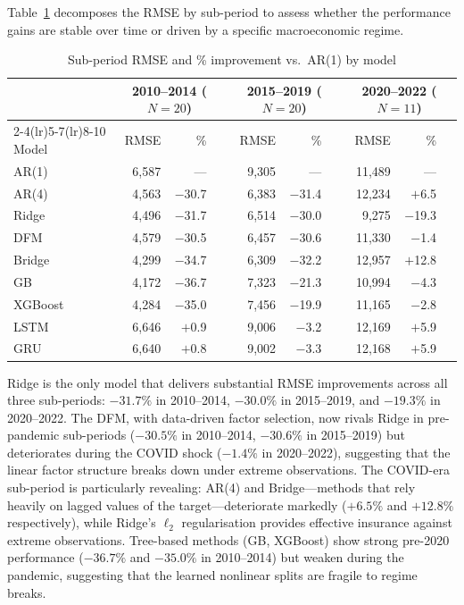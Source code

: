 Table~\ref{tab:ch1_subperiod} decomposes the RMSE by sub-period to assess whether the performance gains are stable over time or driven by a specific macroeconomic regime.

\begin{table}[htbp]
\centering
\caption{Sub-period RMSE and \% improvement vs.\ AR(1) by model}
\label{tab:ch1_subperiod}
\begin{tabular}{@{} l rrr rrr rrr @{}}
\toprule
 & \multicolumn{3}{c}{2010--2014 ($N=20$)} & \multicolumn{3}{c}{2015--2019 ($N=20$)} & \multicolumn{3}{c}{2020--2022 ($N=11$)} \\
\cmidrule(lr){2-4}\cmidrule(lr){5-7}\cmidrule(lr){8-10}
{Model} & {RMSE} & {\%} & & {RMSE} & {\%} & & {RMSE} & {\%} \\
\midrule
AR(1)     & 6{,}587 & ---  && 9{,}305 & ---  && 11{,}489 & --- \\
AR(4)     & 4{,}563 & $-$30.7 && 6{,}383 & $-$31.4 && 12{,}234 & $+$6.5 \\
Ridge     & 4{,}496 & $-$31.7 && 6{,}514 & $-$30.0 && 9{,}275  & $-$19.3 \\
DFM       & 4{,}579 & $-$30.5 && 6{,}457 & $-$30.6  && 11{,}330 & $-$1.4 \\
Bridge    & 4{,}299 & $-$34.7 && 6{,}309 & $-$32.2 && 12{,}957 & $+$12.8 \\
GB        & 4{,}172 & $-$36.7 && 7{,}323 & $-$21.3 && 10{,}994 & $-$4.3 \\
XGBoost   & 4{,}284 & $-$35.0 && 7{,}456 & $-$19.9 && 11{,}165 & $-$2.8 \\
LSTM      & 6{,}646 & $+$0.9  && 9{,}006 & $-$3.2  && 12{,}169 & $+$5.9 \\
GRU       & 6{,}640 & $+$0.8  && 9{,}002 & $-$3.3  && 12{,}168 & $+$5.9 \\
\bottomrule
\end{tabular}
\end{table}

Ridge is the only model that delivers substantial RMSE improvements across all three sub-periods: $-31.7\%$ in 2010--2014, $-30.0\%$ in 2015--2019, and $-19.3\%$ in 2020--2022.  The DFM, with data-driven factor selection, now rivals Ridge in pre-pandemic sub-periods ($-30.5\%$ in 2010--2014, $-30.6\%$ in 2015--2019) but deteriorates during the COVID shock ($-1.4\%$ in 2020--2022), suggesting that the linear factor structure breaks down under extreme observations.  The COVID-era sub-period is particularly revealing: AR(4) and Bridge---methods that rely heavily on lagged values of the target---deteriorate markedly ($+6.5\%$ and $+12.8\%$ respectively), while Ridge's $\ell_2$ regularisation provides effective insurance against extreme observations.  Tree-based methods (GB, XGBoost) show strong pre-2020 performance ($-36.7\%$ and $-35.0\%$ in 2010--2014) but weaken during the pandemic, suggesting that the learned nonlinear splits are fragile to regime breaks. 


